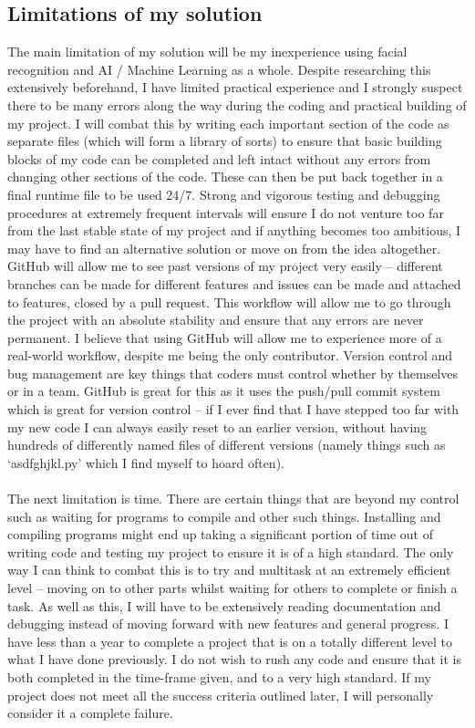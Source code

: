 \documentclass[9pt]{article}
\begin{document}
\subsection{Limitations of my solution}\label{sec_limitations}
The main limitation of my solution will be my inexperience using facial recognition and AI / Machine Learning as a whole. Despite researching this extensively beforehand, I have limited practical experience and I strongly suspect there to be many errors along the way during the coding and practical building of my project. I will combat this by writing each important section of the code as separate files (which will form a library of sorts) to ensure that basic building blocks of my code can be completed and left intact without any errors from changing other sections of the code. These can then be put back together in a final runtime file to be used 24/7. Strong and vigorous testing and debugging procedures at extremely frequent intervals will ensure I do not venture too far from the last stable state of my project and if anything becomes too ambitious, I may have to find an alternative solution or move on from the idea altogether.
GitHub will allow me to see past versions of my project very easily – different branches can be made for different features and issues can be made and attached to features, closed by a pull request. This workflow will allow me to go through the project with an absolute stability and ensure that any errors are never permanent. I believe that using GitHub will allow me to experience more of a real-world workflow, despite me being the only contributor. Version control and bug management are key things that coders must control whether by themselves or in a team. GitHub is great for this as it uses the push/pull commit system which is great for version control – if I ever find that I have stepped too far with my new code I can always easily reset to an earlier version, without having hundreds of differently named files of different versions (namely things such as ‘asdfghjkl.py’ which I find myself to hoard often).\\\\
The next limitation is time. There are certain things that are beyond my control such as waiting for programs to compile and other such things. Installing and compiling programs might end up taking a significant portion of time out of writing code and testing my project to ensure it is of a high standard. The only way I can think to combat this is to try and multitask at an extremely efficient level – moving on to other parts whilst waiting for others to complete or finish a task. As well as this, I will have to be extensively reading documentation and debugging instead of moving forward with new features and general progress. I have less than a year to complete a project that is on a totally different level to what I have done previously. I do not wish to rush any code and ensure that it is both completed in the time-frame given, and to a very high standard. If my project does not meet all the success criteria outlined later, I will personally consider it a complete failure.\\\\
\end{document}
